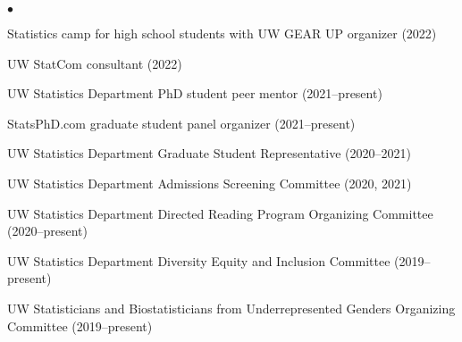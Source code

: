 \documentclass[margin,centered]{res}
\newenvironment{list1}{
  \begin{list}{\ding{113}}{%
      \setlength{\itemsep}{0in}
      \setlength{\parsep}{0in} \setlength{\parskip}{0in}
      \setlength{\topsep}{0in} \setlength{\partopsep}{0in}
      \setlength{\leftmargin}{0.17in}}}{\end{list}}
\newenvironment{list2}{
  \begin{list}{$\bullet$}{%
      \setlength{\itemsep}{0in}
      \setlength{\parsep}{0in} \setlength{\parskip}{0in}
      \setlength{\topsep}{0in} \setlength{\partopsep}{0in}
      \setlength{\leftmargin}{0.2in}}}{\end{list}}
\begin{document}
\begin{resume}
\begin{list1}
\item[]
\begin{list2}
\vspace*{.05in}
\item Statistics camp for high school students with UW GEAR UP organizer (2022)
\item UW StatCom consultant (2022)
\item UW Statistics Department PhD student peer mentor (2021--present)
\item StatsPhD.com graduate student panel organizer (2021--present)
\item UW Statistics Department Graduate Student Representative (2020--2021) 
\item UW Statistics Department Admissions Screening Committee (2020, 2021)
\item UW Statistics Department Directed Reading Program Organizing Committee (2020--present)
\item UW Statistics Department Diversity Equity and Inclusion Committee (2019--present)
\item UW Statisticians and Biostatisticians from Underrepresented Genders Organizing Committee (2019--present)
\end{list2}
\end{list1}






%
\thispagestyle{lastpage}
\end{resume}
\end{document}
